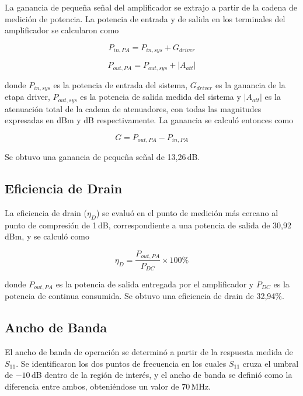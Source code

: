 La ganancia de pequeña señal del amplificador se extrajo a partir de la cadena de medición de potencia. La potencia de entrada y de salida en los terminales del amplificador se calcularon como

\begin{equation}
P_{in,PA} = P_{in,sys} + G_{driver}
\label{eq:pin_pa}
\end{equation}

\begin{equation}
P_{out,PA} = P_{out,sys} + |A_{att}|
\label{eq:pout_pa}
\end{equation}

donde $P_{in,sys}$ es la potencia de entrada del sistema, $G_{driver}$ es la ganancia de la etapa driver, $P_{out,sys}$ es la potencia de salida medida del sistema y $|A_{att}|$ es la atenuación total de la cadena de atenuadores, con todas las magnitudes expresadas en dBm y dB respectivamente. La ganancia se calculó entonces como

\begin{equation}
G = P_{out,PA} - P_{in,PA}
\label{eq:gain_calc}
\end{equation}

Se obtuvo una ganancia de pequeña señal de 13{,}26\,dB.

\subsection{Eficiencia de Drain}
La eficiencia de drain ($\eta_D$) se evaluó en el punto de medición más cercano al punto de compresión de 1\,dB, correspondiente a una potencia de salida de 30{,}92\,dBm, y se calculó como

\begin{equation}
\eta_D = \frac{P_{out,PA}}{P_{DC}} \times 100\%
\label{eq:drain_eff}
\end{equation}

donde $P_{out,PA}$ es la potencia de salida entregada por el amplificador y $P_{DC}$ es la potencia de continua consumida. Se obtuvo una eficiencia de drain de 32{,}94\%.

\subsection{Ancho de Banda}
El ancho de banda de operación se determinó a partir de la respuesta medida de $S_{11}$. Se identificaron los dos puntos de frecuencia en los cuales $S_{11}$ cruza el umbral de $-10$\,dB dentro de la región de interés, y el ancho de banda se definió como la diferencia entre ambos, obteniéndose un valor de 70\,MHz.

